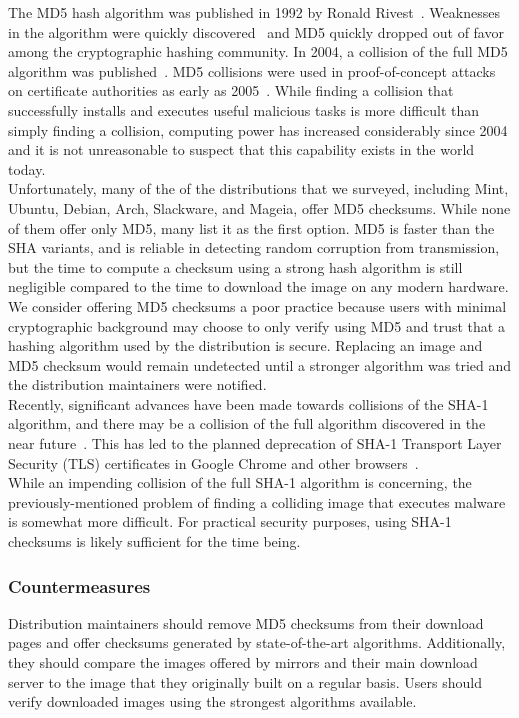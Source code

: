 \documentclass[conference]{IEEEtran}
\begin{document}
The MD5 hash algorithm was published in 1992 by Ronald Rivest~\cite{rivest1992md5}. Weaknesses
in the algorithm were quickly discovered~\cite{md51993} and MD5 quickly dropped out of favor
among the cryptographic hashing community. In 2004, a collision of the full MD5 algorithm was
published~\cite{wang2004collisions}. MD5 collisions were used in proof-of-concept attacks on
certificate authorities as early as 2005~\cite{md5attack}. While finding a collision that
successfully installs and executes useful malicious tasks is more difficult than simply finding
a collision, computing power has increased considerably since 2004 and it is not unreasonable
to suspect that this capability exists in the world today.\\
\indent Unfortunately, many of the of the distributions that we surveyed, including Mint,
Ubuntu, Debian, Arch, Slackware, and Mageia, offer MD5 checksums. While none of them offer
only MD5, many list it as the first option. MD5 is faster than the SHA variants, and is
reliable in detecting random corruption from transmission, but the time to compute a checksum
using a strong hash algorithm is still negligible compared to the time to download the image
on any modern hardware. We consider offering MD5 checksums a poor practice because users with
minimal cryptographic background may choose to only verify using MD5 and trust that a hashing
algorithm used by the distribution is secure. Replacing an image and MD5 checksum would remain
undetected until a stronger algorithm was tried and the distribution maintainers were notified.\\
\indent Recently, significant advances have been made towards collisions of the SHA-1
algorithm, and there may be a collision of the full algorithm discovered in the near
future~\cite{stevens2015freestart}. This has led to the planned deprecation of SHA-1
Transport Layer Security (TLS) certificates in Google Chrome and other
browsers~\cite{chromesha1}.\\
\indent While an impending collision of the full SHA-1 algorithm is concerning, the
previously-mentioned problem of finding a colliding image that executes malware is somewhat
more difficult. For practical security purposes, using SHA-1 checksums is likely sufficient
for the time being.

\subsubsection{Countermeasures}

Distribution maintainers should remove MD5 checksums from their download pages and offer
checksums generated by state-of-the-art algorithms. Additionally, they should compare the
images offered by mirrors and their main download server to the image that they originally
built on a regular basis. Users should verify downloaded images using the strongest algorithms
available.
\end{document}
